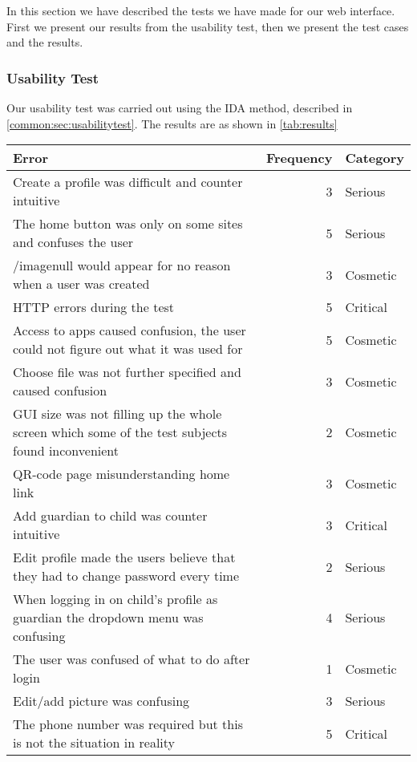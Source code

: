 In this section we have described the tests we have made for our web interface. First we present our results from the usability test, then we present the test cases and the results.

\subsubsection{Usability Test}

Our usability test was carried out using the IDA method, described in \autoref{common:sec:usabilitytest}. The results are as shown in \autoref{tab:results}

\begin{table}
	\scriptsize
	\centering
	\begin{tabular}{|p{7cm}|r|l|}
		\hline
		Error & Frequency & Category \\
		\hline
		\hline
		Create a profile was difficult and counter intuitive & 3 & Serious \\ \hline
		The home button was only on some sites and confuses the user & 5 & Serious \\ \hline
		/imagenull would appear for no reason when a user was created & 3 & Cosmetic \\ \hline
		HTTP errors during the test & 5 & Critical \\ \hline
		Access to apps caused confusion, the user could not figure out what it was used for & 5 & Cosmetic \\ \hline
		Choose file was not further specified and caused confusion & 3 & Cosmetic \\ \hline
		GUI size was not filling up the whole screen which some of the test subjects found inconvenient & 2 & Cosmetic \\ \hline
		QR-code page misunderstanding home link & 3 & Cosmetic \\ \hline
		Add guardian to child was counter intuitive & 3 & Critical \\ \hline
		Edit profile made the users believe that they had to change password every time & 2 & Serious \\ \hline
		When logging in on child's profile as guardian the dropdown menu was confusing & 4 & Serious \\ \hline
		The user was confused of what to do after login & 1 & Cosmetic \\ \hline
		Edit/add picture was confusing & 3 & Serious \\ \hline
		The phone number was required but this is not the situation in reality & 5 & Critical \\ \hline

\end{tabular}
\end{table}
